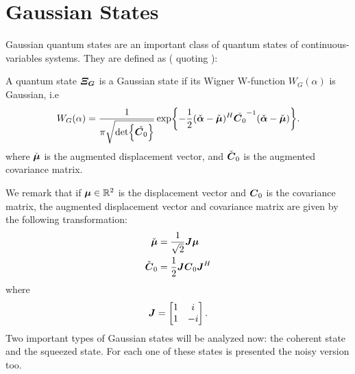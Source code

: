 \section{Gaussian States}
    \label{def:Gaussian}
    Gaussian quantum states are an important class of quantum states of continuous-variables systems.
    They are defined as (\cite{tesiGuerrini} quoting \cite{Gaussian1,Gaussian2,ContinuousVar,Gaussian4,Gaussian5}):
    \begin{definition}
        A quantum state $\bm{\relax{\varXi_G}}$ is a Gaussian state if its Wigner W-function $W_G(\alpha)$
        is Gaussian, i.e
        \begin{equation}
            W_G(\alpha)=\frac{1}{\pi\sqrt{\det{\check{\Operator{C}_0}}}}\exp{
                -\frac{1}{2}(\check{\Vector{\alpha}}-\check{\Vector{\mu}})^H
                \check{\Operator{C}_0}^{-1}(\check{\Vector{\alpha}}-\check{\Vector{\mu}})}.
        \end{equation}
        where $\check{\Vector{\mu}} $ is the augmented displacement vector, and $\check{\bm{\relax{C}}}_0$ 
        is the augmented covariance matrix. 
    \end{definition}
    
    We remark that if $\Vector{\mu} \in \mathbb{R}^2$ is the 
    displacement vector and $\bm{\relax{C}}_0$ is the covariance matrix, the augmented displacement vector
    and covariance matrix are given by the following transformation:
    \begin{subequations}
        \begin{align}
            \check{\Vector{\mu}} &= \frac{1}{\sqrt{2}} \Operator{J} \Vector{\mu}\\
            \check{\Operator{C}}_0 &= \frac{1}{2} \Operator{J} \Operator{C}_0 \Operator{J}^H
        \end{align}
    \end{subequations}
    where
    \begin{equation*}
        \bm{\relax{J}} = 
        \begin{bmatrix}
            1 & i\\
            1 & -i
        \end{bmatrix}.
    \end{equation*}
    Two important types of Gaussian states will be analyzed now: the coherent state and the
    squeezed state. For each one of these states is presented the noisy version too.

